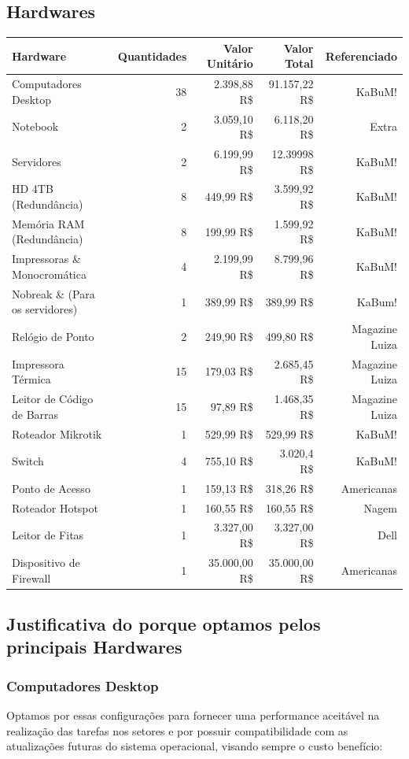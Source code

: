 \documentclass[12pt]{article}
\begin{document}
\subsection{Hardwares}
\begin{center}
\begin{tabular}{| l | r | r | r | r |}
\hline 
Hardware & Quantidades & Valor Unitário & Valor Total & Referenciado\\
\hline
Computadores Desktop & 38 & 2.398,88 R\$ & 91.157,22 R\$ & KaBuM!\\
Notebook & 2 & 3.059,10 R\$ & 6.118,20 R\$ & Extra\\
Servidores & 2 & 6.199,99 R\$ & 12.39998 R\$ & KaBuM!\\
HD 4TB (Redundância) & 8 & 449,99 R\$ & 3.599,92 R\$ & KaBuM!\\
Memória RAM (Redundância) & 8 & 199,99 R\$ & 1.599,92 R\$ & KaBuM!\\
Impressoras \& Monocromática & 4 & 2.199,99 R\$ & 8.799,96 R\$ & KaBuM!\\
Nobreak \& (Para os servidores) & 1 & 389,99 R\$ & 389,99 R\$ & KaBum!\\
Relógio de Ponto & 2 & 249,90 R\$ & 499,80 R\$ & Magazine Luiza\\ 
Impressora Térmica & 15 & 179,03 R\$ & 2.685,45 R\$ & Magazine Luiza\\
Leitor de Código de Barras & 15 & 97,89 R\$ & 1.468,35 R\$ & Magazine Luiza\\
Roteador Mikrotik & 1 & 529,99 R\$ & 529,99 R\$ & KaBuM!\\
Switch & 4 & 755,10 R\$ & 3.020,4 R\$ & KaBuM!\\
Ponto de Acesso & 1 & 159,13 R\$ & 318,26 R\$ & Americanas\\
Roteador Hotspot & 1 & 160,55 R\$ & 160,55 R\$ & Nagem\\
Leitor de Fitas & 1 & 3.327,00 R\$ & 3.327,00 R\$ & Dell\\
Dispositivo de Firewall & 1 & 35.000,00 R\$ & 35.000,00 R\$ & Americanas\\
\hline
\end{tabular}
\end{center}

\subsection{Justificativa do porque optamos pelos principais Hardwares}

\subsubsection{Computadores Desktop}
Optamos por essas configurações para fornecer uma performance aceitável na realização das tarefas nos setores e por possuir compatibilidade com as atualizações futuras do sistema operacional, visando sempre o custo benefício:
\end{document}
